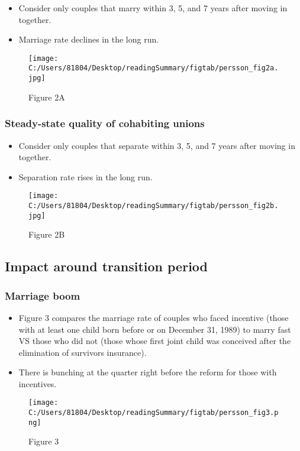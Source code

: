 \documentclass[a4paper, 12pt]{article}
\begin{document}
\begin{itemize}
\item Consider only couples that marry within 3, 5, and 7 years after moving in together.
\item Marriage rate declines in the long run.
\end{itemize}

\begin{figure}[h!]
\center
\texttt{[image: C:/Users/81804/Desktop/readingSummary/figtab/persson\_fig2a.jpg]}
\caption*{Figure 2A}
\end{figure}

\subsubsection{Steady-state quality of cohabiting unions}
\begin{itemize}
\item Consider only couples that separate within 3, 5, and 7 years after moving in together.
\item Separation rate rises in the long run.
\end{itemize}


\begin{figure}[h!]
\center
\texttt{[image: C:/Users/81804/Desktop/readingSummary/figtab/persson\_fig2b.jpg]}
\caption*{Figure 2B}
\end{figure}

\subsection{Impact around transition period}

\subsubsection{Marriage boom}

\begin{itemize}
\item Figure 3 compares the marriage rate of couples who faced incentive (those with at least one child born before or on December 31, 1989) to marry fast VS those who did not (those whose first joint child was conceived after the elimination of survivors insurance).
\item There is bunching at the quarter right before the reform for those with incentives.
\end{itemize}

\begin{figure}[h!]
\center
\texttt{[image: C:/Users/81804/Desktop/readingSummary/figtab/persson\_fig3.png]}
\caption*{Figure 3}
\end{figure}
\end{document}
